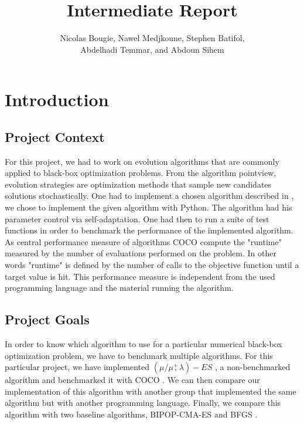 \documentclass{article}
\begin{document}
\title{Intermediate Report}

\author{Nicolas Bougie, Nawel Medjkoune, Stephen Batifol,\\ Abdelhadi Temmar, and Abdoun Sihem}
\maketitle



\section{Introduction}

\subsection{Project Context}


For this project, we had to work on evolution algorithms that are commonly applied to black-box optimization problems. From the algorithm pointview, evolution strategies are optimization methods that sample new candidates solutions stochastically.
One had to implement a chosen algorithm described in \cite{DBLP:reference/sp/HansenAA15}, we chose to implement the given algorithm with Python. The algorithm had his parameter control via self-adaptation. One had then to run a suite of test functions in order to benchmark the performance of the implemented algorithm.  As central performance measure of algorithms COCO compute the "runtime" measured by the number of evaluations performed on the problem. In other words "runtime" is defined by the number of calls to the objective function until a target value is hit. This performance measure is independent from the used programming language and the material running the algorithm.



\subsection{Project Goals}
In order to know which algorithm to use for a particular numerical black-box optimization problem, we have to benchmark multiple algorithms. For this particular project, we have implemented   $(\mu / \mu \overset{+}{,} \lambda)-ES$ \cite{DBLP:reference/sp/HansenAA15}, a non-benchmarked algorithm and benchmarked it with COCO \cite{DBLP:journals/corr/HansenAMTB16}. We can then compare our implementation of this algorithm with another group that implemented the same algorithm but with another programming language. Finally, we compare this algorithm with two  baseline algorithms, BIPOP-CMA-ES \cite{hansen2009benchmarking} and BFGS \cite{ros2009benchmarking}.
\end{document}

